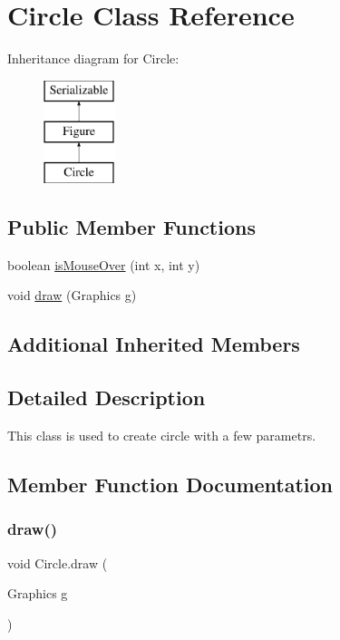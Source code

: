 \hypertarget{class_circle}{}\section{Circle Class Reference}
\label{class_circle}
Inheritance diagram for Circle\+:\begin{figure}[H]
\begin{center}
\leavevmode
\includegraphics[height=3.000000cm]{class_circle}
\end{center}
\end{figure}
\subsection*{Public Member Functions}
\begin{DoxyCompactItemize}
\item 
boolean \mbox{\hyperlink{class_circle_a8e13cf7320430bac26c1d64d4869b1b9}{is\+Mouse\+Over}} (int x, int y)
\item 
void \mbox{\hyperlink{class_circle_aeac85bfb9e1f4a2fa8f1d6c6ac2745b6}{draw}} (Graphics g)
\end{DoxyCompactItemize}
\subsection*{Additional Inherited Members}


\subsection{Detailed Description}
This class is used to create circle with a few parametrs. 

\subsection{Member Function Documentation}
\mbox{\label{class_circle_aeac85bfb9e1f4a2fa8f1d6c6ac2745b6}} 
\subsubsection{\texorpdfstring{draw()}{draw()}}
{\footnotesize\ttfamily void Circle.\+draw (\begin{DoxyParamCaption}\item[{Graphics}]{g }\end{DoxyParamCaption})}

